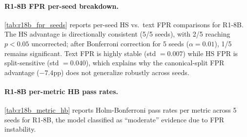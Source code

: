 \paragraph{R1-8B FPR per-seed breakdown.} \cref{tab:r18b_fpr_seeds} reports per-seed HS vs.\ text FPR comparisons for R1-8B. The HS advantage is directionally consistent (5/5 seeds), with 2/5 reaching $p{<}0.05$ uncorrected; after Bonferroni correction for 5 seeds ($\alpha{=}0.01$), 1/5 remains significant. Text FPR is highly stable (std $= 0.007$) while HS FPR is split-sensitive (std $= 0.040$), which explains why the canonical-split FPR advantage ($-7.4$pp) does not generalize robustly across seeds.

\begin{table}[htbp]
\centering
\small
\caption{R1-8B FPR per-seed comparison (L14, $W{=}15$; main text \cref{tab:hs_vs_text} reports $W{=}3$ after 5-seed validation). Direction is consistent (5/5 HS $\leq$ Text); 2/5 reach $p{<}0.05$ uncorrected, 1/5 after Bonferroni correction (5 seeds, $\alpha{=}0.01$).}
\label{tab:r18b_fpr_seeds}
\end{table}

\paragraph{R1-8B per-metric HB pass rates.} \cref{tab:r18b_metric_hb} reports Holm-Bonferroni pass rates per metric across 5 seeds for R1-8B, the model classified as ``moderate'' evidence due to FPR instability.

